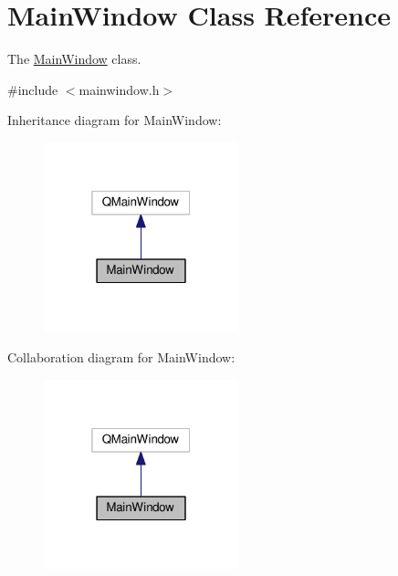 \hypertarget{classMainWindow}{\section{Main\-Window Class Reference}
\label{classMainWindow}
}


The \hyperlink{classMainWindow}{Main\-Window} class.  




{\ttfamily \#include $<$mainwindow.\-h$>$}



Inheritance diagram for Main\-Window\-:
\nopagebreak
\begin{figure}[H]
\begin{center}
\leavevmode
\includegraphics[width=160pt]{classMainWindow__inherit__graph}
\end{center}
\end{figure}


Collaboration diagram for Main\-Window\-:
\nopagebreak
\begin{figure}[H]
\begin{center}
\leavevmode
\includegraphics[width=160pt]{classMainWindow__coll__graph}
\end{center}
\end{figure}
